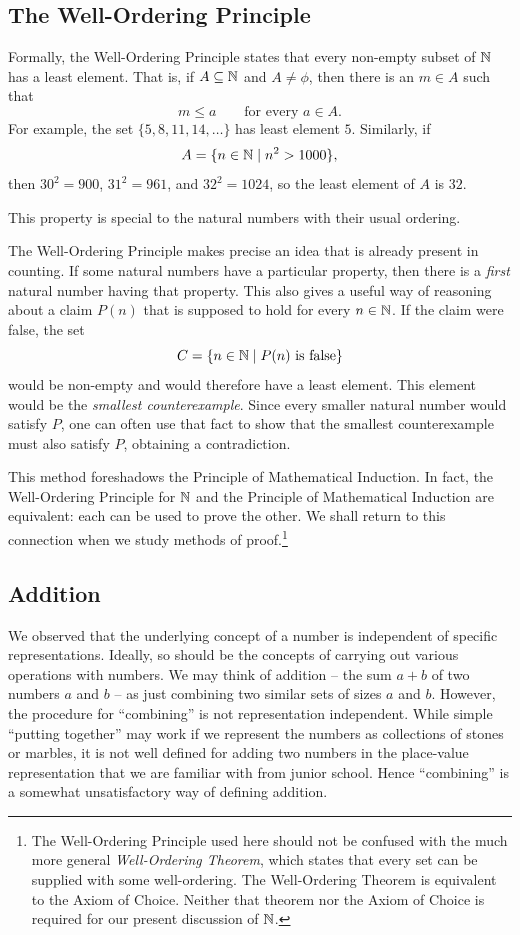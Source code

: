 \subsection{The Well-Ordering Principle}
\label{sec:well-ordering}
Formally, the Well-Ordering Principle states that every non-empty subset of
$\mathbb{N}$ has a least element. That is, if $A\subseteq\mathbb{N}$ and $A\neq\phi$, then
there is an $m\in A$ such that
\[
m\leq a\qquad\mbox{for every }a\in A.
\]
For example, the set $\{5,8,11,14,\ldots\}$ has least element $5$. Similarly,
if
\[
A=\{n\in\mathbb{N}\mid n^2>1000\},
\]
then $30^2=900$, $31^2=961$, and $32^2=1024$, so the least element of $A$
is $32$.

This property is special to the natural numbers with their usual ordering. 

The Well-Ordering Principle makes precise an idea that is already present in
counting. If some natural numbers have a particular property, then there is a
\emph{first} natural number having that property. This also gives a useful way
of reasoning about a claim $P(n)$ that is supposed to hold for every
$n\in\mathbb{N}$. If the claim were false, the set
\[
C=\{n\in\mathbb{N}\mid P(n)\mbox{ is false}\}
\]
would be non-empty and would therefore have a least element. This element would
be the \emph{smallest counterexample}. Since every smaller natural number would
satisfy $P$, one can often use that fact to show that the smallest
counterexample must also satisfy $P$, obtaining a contradiction.

This method foreshadows the Principle of Mathematical Induction. In fact, the
Well-Ordering Principle for $\mathbb{N}$ and the Principle of Mathematical Induction
are equivalent: each can be used to prove the other. We shall return to this
connection when we study methods of proof.\footnote{ The Well-Ordering Principle used here should not be confused with the much more
general \emph{Well-Ordering Theorem}, which states that every set can be supplied
with some well-ordering. The Well-Ordering Theorem is equivalent to the Axiom of
Choice. Neither that theorem nor the Axiom of Choice is required for our present
discussion of $\mathbb{N}$.}

\subsection{Addition}

We observed that the underlying concept of a number is independent of specific representations. Ideally, so should be the concepts of carrying out various operations with numbers. We may think of addition -- the sum $a+b$ of two numbers $a$ and $b$ -- as just combining two similar sets of sizes $a$ and $b$. However, the procedure for ``combining'' is not representation independent. While simple ``putting together'' may work if we represent the numbers as collections of stones or marbles, it is not well defined for adding two numbers in the place-value representation that we are familiar with from junior school. Hence ``combining'' is a somewhat unsatisfactory way of defining addition. 

